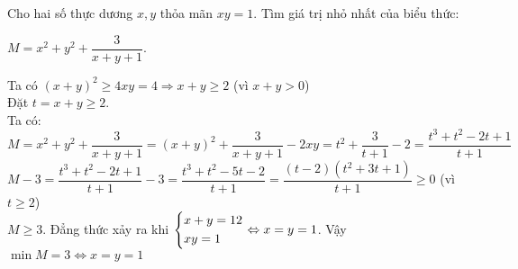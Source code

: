 \begin{ex}%
    Cho hai số thực dương $x,y$ thỏa mãn $xy = 1$. Tìm giá trị nhỏ nhất của biểu thức:
    \begin{center}
$M=x^2+y^2+\dfrac{3}{x+y+1}$.
    \end{center}
\loigiai
{Ta có $(x+y)^2\geq 4xy=4\Rightarrow x+y\geq 2 $ (vì $x+y>0$)\\
	Đặt $t=x+y\geq 2$.\\
	Ta có: $M=x^2+y^2+\dfrac{3}{x+y+1}=(x+y)^2+\dfrac{3}{x+y+1}-2xy=t^2+\dfrac{3}{t+1}-2=\dfrac{t^3+t^2-2t+1}{t+1}$\\
	$M-3=\dfrac{t^3+t^2-2t+1}{t+1}-3=\dfrac{t^3+t^2-5t-2}{t+1}=\dfrac{(t-2)(t^2+3t+1)}{t+1}\geq 0$ (vì $t\geq 2 $)\\
	$M\geq 3 $. Đẳng thức xảy ra khi $\left\{\begin{aligned}&x+y=12\\&xy=1\end{aligned}\right.\Leftrightarrow x=y=1 $. Vậy $\min M=3\Leftrightarrow x=y=1$    
    }
\end{ex}
